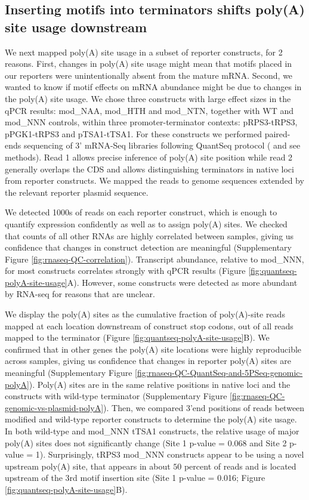 \documentclass[../main.tex]{subfiles}
\begin{document}
\subsection{Inserting motifs into terminators shifts poly(A) site usage downstream}

We next mapped poly(A) site usage in a subset of reporter constructs, for 2 reasons.
First, changes in poly(A) site usage might mean that motifs placed in our reporters were unintentionally absent from the mature mRNA.
Second, we wanted to know if motif effects on mRNA abundance might be due to changes in the poly(A) site usage.
We chose three constructs with large effect sizes in the qPCR results: mod\_NAA, mod\_HTH and mod\_NTN, together with WT and mod\_NNN controls, within three promoter-terminator contexts: pRPS3-tRPS3, pPGK1-tRPS3 and pTSA1-tTSA1.
For these constructs we performed paired-ends sequencing of 3' mRNA-Seq libraries following QuantSeq protocol (\parencite{Moll2014} and see methods).
Read 1 allows precise inference of poly(A) site position while read 2 generally overlaps the CDS and allows distinguishing terminators in native loci from reporter constructs.
We mapped the reads to genome sequences extended by the relevant reporter plasmid sequence.

We detected 1000s of reads on each reporter construct, which is enough to quantify expression confidently as well as to assign poly(A) sites.
We checked that counts of all other RNAs are highly correlated between samples, giving us confidence that changes in construct detection are meaningful (Supplementary Figure \ref{fig:rnaseq-QC-correlation}).
Transcript abundance, relative to mod\_NNN, for most constructs correlates strongly with qPCR results (Figure \ref{fig:quantseq-polyA-site-usage}A).
However, some constructs were detected as more abundant by RNA-seq for reasons that are unclear.

We display the poly(A) sites as the cumulative fraction of poly(A)-site reads mapped at each location downstream of construct stop codons, out of all reads mapped to the terminator (Figure \ref{fig:quantseq-polyA-site-usage}B).
We confirmed that in other genes the poly(A) site locations were highly reproducible across samples, giving us confidence that changes in reporter poly(A) sites are meaningful (Supplementary Figure \ref{fig:rnaseq-QC-QuantSeq-and-5PSeq-genomic-polyA}).
Poly(A) sites are in the same relative positions in native loci and the constructs with wild-type terminator (Supplementary Figure \ref{fig:rnaseq-QC-genomic-vs-plasmid-polyA}).
Then, we compared 3'end positions of reads between modified and wild-type reporter constructs to determine the poly(A) site usage.
In both wild-type and mod\_NNN tTSA1 constructs, the relative usage of major poly(A) sites does not significantly change (Site 1 p-value = 0.068 and Site 2 p-value = 1).
Surprisingly, tRPS3 mod\_NNN constructs appear to be using a novel upstream poly(A) site, that appears in about \(50%
\) percent of reads and is located upstream of the 3rd motif insertion site (Site 1 p-value = 0.016; Figure \ref{fig:quantseq-polyA-site-usage}B).
\end{document}
